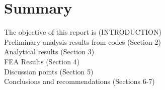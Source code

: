 \chapter{Summary}

The objective of this report is (INTRODUCTION)\\

Preliminary analysis results from codes (Section 2)\\ 

Analytical results (Section 3)\\

FEA Results (Section 4)\\	

Discussion points (Section 5)\\

Conclusions and recommendations (Sections 6-7)


